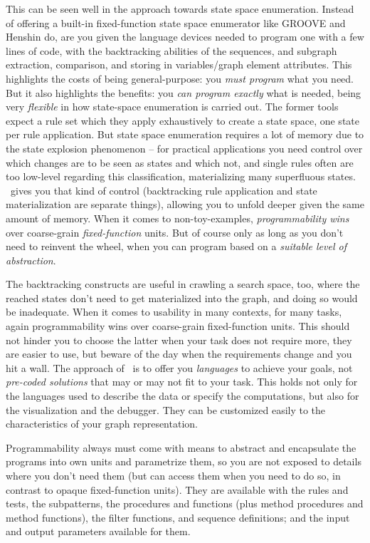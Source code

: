 This can be seen well in the approach towards state space enumeration. 
Instead of offering a built-in fixed-function state space enumerator like GROOVE and Henshin do, are you given the language devices needed to program one with a few lines of code, with the backtracking abilities of the sequences, and subgraph extraction, comparison, and storing in variables/graph element attributes.
This highlights the costs of being general-purpose: you \emph{must program} what you need.
But it also highlights the benefits: you \emph{can program exactly} what is needed, being very \emph{flexible} in how state-space enumeration is carried out.
The former tools expect a rule set which they apply exhaustively to create a state space, one state per rule application. 
But state space enumeration requires a lot of memory due to the state explosion phenomenon -- for practical applications you need control over which changes are to be seen as states and which not, and single rules often are too low-level regarding this classification, materializing many superfluous states.
\GrG\ gives you that kind of control (backtracking rule application and state materialization are separate things), allowing you to unfold deeper given the same amount of memory. 
When it comes to non-toy-examples, \emph{programmability wins} over coarse-grain \emph{fixed-function} units.
But of course only as long as you don't need to reinvent the wheel, when you can program based on a \emph{suitable level of abstraction}.

The backtracking constructs are useful in crawling a search space, too, where the reached states don't need to get materialized into the graph, and doing so would be inadequate.
When it comes to usability in many contexts, for many tasks, again programmability wins over coarse-grain fixed-function units.
This should not hinder you to choose the latter when your task does not require more, they are easier to use, but beware of the day when the requirements change and you hit a wall.
The approach of \GrG\ is to offer you \emph{languages} to achieve your goals, not \emph{pre-coded solutions} that may or may not fit to your task.
This holds not only for the languages used to describe the data or specify the computations, but also for the visualization and the debugger. They can be customized easily to the characteristics of your graph representation. 

Programmability always must come with means to abstract and encapsulate the programs into own units and parametrize them, so you are not exposed to details where you don't need them (but can access them when you need to do so, in contrast to opaque fixed-function units).
They are available with the rules and tests, the subpatterns, the procedures and functions (plus method procedures and method functions), the filter functions, and sequence definitions; and the input and output parameters available for them.

